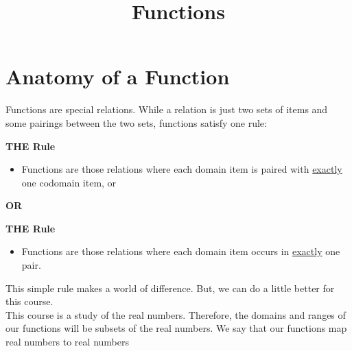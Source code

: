 \documentclass{ximera}
\title{Functions}
\begin{document}
\begin{abstract}
\end{abstract}
\maketitle





\section{Anatomy of a Function}


Functions are special relations. While a relation is just two sets of items and some pairings between the two sets, functions satisfy one rule: \\


\begin{condition} \textbf{\textcolor{purple!85!blue}{THE Rule}}  \\

\begin{itemize}
\item Functions are those relations where each domain item is paired with \underline{exactly} one codomain item, or
\end{itemize}
\end{condition}


\begin{center}
\textbf{OR}
\end{center}


\begin{condition} \textbf{\textcolor{purple!85!blue}{THE Rule}} \\

\begin{itemize}
\item Functions are those relations where each domain item occurs in \underline{exactly} one pair.
\end{itemize}
\end{condition}




This simple rule makes a world of difference. But, we can do a little better for this course. \\




This course is a study of the real numbers.  Therefore, the domains and ranges of our functions will be subsets of the real numbers.  We say that our functions map real numbers to real numbers
\end{document}
